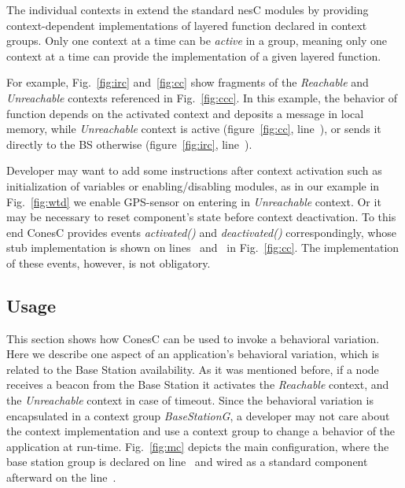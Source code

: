 

The individual contexts in \conesc extend the standard nesC modules by
providing context-dependent implementations of layered function
declared in context groups. Only one context at a time can be
\emph{active} in a group, meaning only one context at a time can
provide the implementation of a given layered function.


For example, Fig.~\ref{fig:irc} and~\ref{fig:cc} show fragments of the
\emph{Reachable} and \emph{Unreachable} contexts referenced in
Fig.~\ref{fig:ccc}. In this example, the behavior of function
 depends on the activated context and deposits a message
in local memory, while \emph{Unreachable} context is active
(figure~\ref{fig:cc}, line~), or sends it directly
to the BS otherwise (figure~\ref{fig:irc}, line~).

Developer may want to add some instructions after context activation
such as initialization of variables or enabling/disabling modules, as
in our example in Fig.~\ref{fig:wtd} we enable GPS-sensor on entering
in \emph{Unreachable} context. Or it may be necessary to reset
component's state before context deactivation. To this end ConesC
provides events \emph{activated()} and \emph{deactivated()}
correspondingly, whose stub implementation is shown on
lines~ and~ in
Fig.~\ref{fig:cc}. The implementation of these events, however, is not
obligatory.

\subsection{Usage}\label{subsec:usage}

This section shows how ConesC can be used to invoke a behavioral
variation. Here we describe one aspect of an application's behavioral variation,
which is related to the Base Station availability. As it was mentioned before,
if a node receives a beacon from the Base Station it activates the \emph{Reachable}
context, and the \emph{Unreachable} context in case of timeout.
Since the behavioral variation is encapsulated in a context group \emph{BaseStationG},
a developer may not care about the context implementation and use a context group
to change a behavior of the application at run-time. Fig.~\ref{fig:mc} depicts the main
configuration, where the base station group is declared on line~ and wired
as a standard component afterward on the line~.

